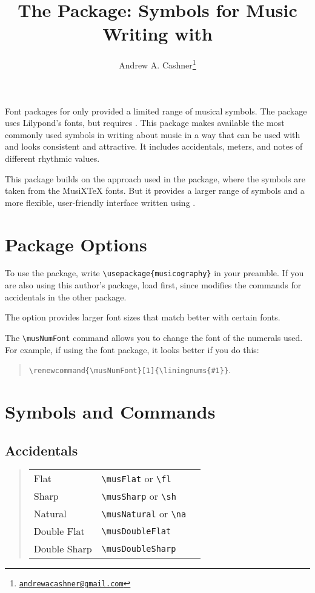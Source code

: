 \documentclass{article}
\title{The \code{musicography} Package: Symbols for Music Writing with
\code{pdflatex}}
\author{Andrew A. Cashner\thanks{%
    \href{mailto:andrewacashner@gmail.com}
    {\nolinkurl{andrewacashner@gmail.com}}%
    }%
}
\newenvironment{codetable}
{\begin{quote}\begin{tabular}{lll}}
{\end{tabular}\end{quote}}
\begin{document}
\maketitle

Font packages for  only provided a limited range of musical
symbols. 
The  package uses Lilypond's fonts, but requires
. 
This package makes available the most commonly used symbols in writing about
music in a way that can be used with  and looks consistent and
attractive.
It includes accidentals, meters, and notes of different rhythmic values.

This package builds on the approach used in the  package, where
the symbols are taken from the MusiXTeX fonts.
But it provides a larger range of symbols and a more flexible, user-friendly
interface written using .

\tableofcontents

\section{Package Options}

To use the package, write \verb|\usepackage{musicography}| in your preamble.
If you are also using this author's  package, load
 first, since  modifies the commands
for accidentals in the other package.

The  option provides larger font sizes that match better with
certain fonts.

The \verb|\musNumFont| command allows you to change the font of the numerals
used.
For example, if using the  font package, it looks better if you
do this: 
\begin{quote}
    \verb|\renewcommand{\musNumFont}[1]{\liningnums{#1}}|.
\end{quote}

\section{Symbols and Commands}

\subsection{Accidentals}

\begin{codetable}
    Flat & \verb|\musFlat| or \verb|\fl| & \musFlat\\
    Sharp & \verb|\musSharp| or \verb|\sh| & \musSharp\\
    Natural & \verb|\musNatural| or \verb|\na| & \musNatural\\
    Double Flat & \verb|\musDoubleFlat| & \musDoubleFlat\\
    Double Sharp & \verb|\musDoubleSharp| & \musDoubleSharp\\
\end{codetable}
\end{document}
